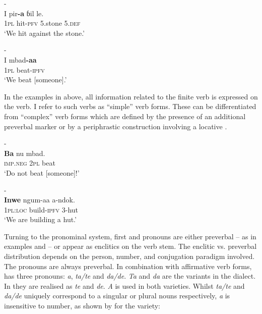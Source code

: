\documentclass[output=paper
,newtxmath
,modfonts
,nonflat]{langsci/langscibook}
\begin{document}
\ea\label{ex:apel:2} 
\ea\label{ex:apel:2a}{- \citep[193]{Faye1979}}\\
\gll I pir\textbf{-a} ɓil le. \\
     \textsc{1pl} hit-\textsc{pfv} 5.stone 5.\textsc{def}\\
\glt ‘We hit against the stone.’ 

\ex\label{ex:apel:2b} {- \citep[217]{Faye1979}}\\
\gll I mbad\textbf{-aa} \\
     \textsc{1pl} beat\textsc{-}\textsc{ipfv}   \\
\glt ‘We beat [someone].’
\z
\z

In the examples in  above, all information related to the finite verb is expressed on the verb. I refer to such verbs as “simple” verb forms. These can be differentiated from “complex” verb forms which are defined by the presence of an additional preverbal marker  or by a periphrastic construction involving a locative  .

\ea\label{ex:apel:3} 
\ea\label{ex:apel:3a}{- \citep[217]{Faye1979}}\\
\gll \textbf{Ba} nu mbad.\\
     \textsc{imp.neg} \textsc{2pl} beat\\
\glt ‘Do not beat [someone]!’ 

\ex\label{ex:apel:3b} {- \citep[248]{Faye1979}}\\
\gll \textbf{Inwe} ngum-aa a-ndok.\\
     1\textsc{pl:loc} build-\textsc{ipfv} 3-hut   \\
\glt  ‘We are building a hut.’
\z
\z

Turning to the pronominal system, first and   pronouns are either preverbal -- as in examples  and  -- or appear as enclitics on the verb stem. The enclitic vs. preverbal distribution depends on the person, number, and conjugation paradigm involved. The   pronouns are always preverbal. In combination with affirmative verb forms,  has three   pronouns: \textit{a}, \textit{ta/te} and \textit{da/de}. \textit{Ta} and \textit{da} are the variants in the  dialect. In  they are realised as \textit{te} and \textit{de}. \textit{A} is used in both varieties. Whilst \textit{ta/te} and \textit{da/de} uniquely correspond to a singular or plural nouns respectively, \textit{a} is insensitive to number, as shown by  for the  variety:
\end{document}
